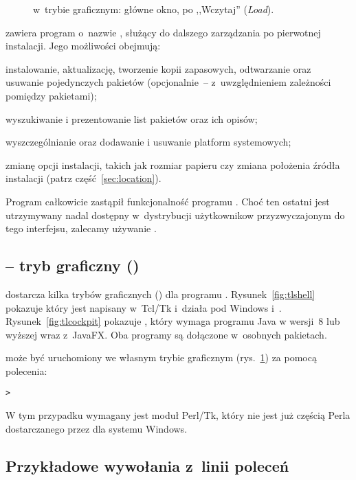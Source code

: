 \documentclass{article}
\begin{document}
\begin{figure}[tb]
\caption{ w~trybie graficznym: główne okno, po
,,Wczytaj'' (\textit{Load}).}
\label{fig:tlmgr-gui}
\end{figure}

\TL{} zawiera program o~nazwie  , służący do dalszego
zarządzania \TL{} po pierwotnej instalacji. Jego możliwości obejmują:

\begin{itemize*}
\item instalowanie, aktualizację, tworzenie kopii zapasowych, odtwarzanie
 oraz usuwanie pojedynczych pakietów (opcjonalnie~-- z~uwzględnieniem
 zależności pomiędzy pakietami);
\item wyszukiwanie i prezentowanie list pakietów oraz ich opisów;
\item wyszczególnianie oraz dodawanie i usuwanie platform systemowych;
\item zmianę opcji instalacji, takich jak rozmiar papieru czy zmiana
 położenia źródła instalacji (patrz część~\ref{sec:location}).
\end{itemize*}

Program  całkowicie zastąpił funkcjonalność programu
. Choć ten ostatni jest utrzymywany nadal dostępny w~dystrybucji \TL{}
użytkownikow przyzwyczajonym do tego interfejsu, zalecamy używanie .


\subsection{ -- tryb graficzny (\GUI)}

\TL{} dostarcza kilka trybów graficznych (\GUI) dla programu .
Rysunek~\ref{fig:tlshell} pokazuje  który jest napisany
w~Tcl/Tk i~działa pod Windows i~\MacOSX{}. Rysunek~\ref{fig:tlcockpit}
pokazuje , który wymaga programu Java w wersji~8 lub wyższej
wraz z~JavaFX. Oba programy są dołączone w~osobnych pakietach.

 może być uruchomiony we własnym trybie graficznym
(rys.~\ref{fig:tlmgr-gui}) za pomocą polecenia:
\begin{alltt}
> 
\end{alltt}
W tym przypadku wymagany jest moduł Perl/Tk, który nie jest już częścią Perla
dostarczanego przez \TL{} dla systemu Windows.

\subsection{Przykładowe wywołania  z~linii poleceń}
\end{document}
